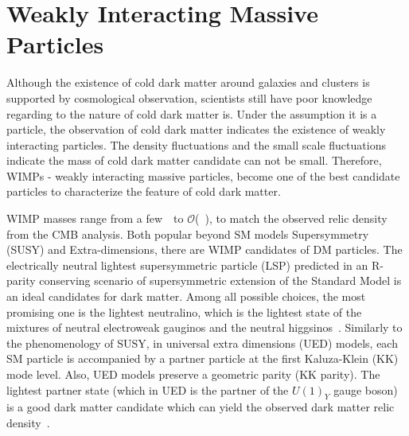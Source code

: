\section{Weakly Interacting Massive Particles}
\label{sec:dms2}
\par Although the existence of cold dark matter around galaxies and clusters is supported by cosmological observation, scientists still have poor knowledge regarding to the nature of cold dark matter is. Under the assumption it is a particle, the observation of cold dark matter indicates the existence of weakly interacting particles. The density fluctuations and the small scale fluctuations indicate the mass of cold dark matter candidate can not be small. Therefore, WIMPs - weakly interacting massive particles, become one of the best candidate particles to characterize the feature of cold dark matter.

\par WIMP masses range from a few~\GeV~to $\mathcal{O}$(~\TeV), to match the observed relic density from the CMB analysis. Both popular beyond SM models Supersymmetry (SUSY) and Extra-dimensions, there are WIMP candidates of DM particles. The electrically neutral lightest supersymmetric particle (LSP) predicted in an R-parity conserving scenario of supersymmetric extension of the Standard Model is an ideal candidates for dark matter. Among all possible choices, the most promising one is the lightest neutralino, which is the lightest state of the mixtures of neutral electroweak gauginos and the neutral higgsinos~\cite{Feng:2010gw}. Similarly to the phenomenology of SUSY, in universal extra dimensions (UED) models, each SM particle is accompanied by a partner particle at the first Kaluza-Klein (KK) mode level. Also, UED models preserve a geometric parity (KK parity). The lightest partner state (which in UED is the partner of the $U(1)_Y$ gauge boson) is a good dark matter candidate which can yield the observed dark matter relic density~\cite{Servant:2002aq}.

